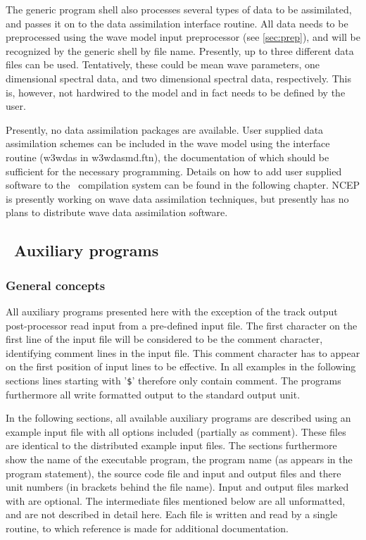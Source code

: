 The generic program shell also processes several types of data to be
assimilated, and passes it on to the data assimilation interface routine. All
data needs to be preprocessed using the wave model input preprocessor (see
\para\ref{sec:prep}), and will be recognized by the generic shell by file
name. Presently, up to three different data files can be used. Tentatively,
these could be mean wave parameters, one dimensional spectral data, and two
dimensional spectral data, respectively. This is, however, not hardwired to
the model and in fact needs to be defined by the user.

Presently, no data assimilation packages are available. User supplied data
assimilation schemes can be included in the wave model using the interface
routine ({\F w3wdas} in {\file w3wdasmd.ftn}), the documentation of which
should be sufficient for the necessary programming. Details on how to add user
supplied software to the \ws\ compilation system can be found in the following
chapter. NCEP is presently working on wave data assimilation techniques, but
presently has no plans to distribute wave data assimilation software.

\pb

\vssub
\subsection{~Auxiliary programs} \label{sec:auxprog}
\vsssub
\subsubsection{General concepts}
\vsssub

All auxiliary programs presented here with the exception of the track output
post-processor read input from a pre-defined input file. The first character
on the first line of the input file will be considered to be the comment
character, identifying comment lines in the input file. This comment character
has to appear on the first position of input lines to be effective. In all
examples in the following sections lines starting with '{\tt \$}' therefore
only contain comment. The programs furthermore all write formatted output to
the standard output unit.

In the following sections, all available auxiliary programs are described
using an example input file with all options included (partially as
comment). These files are identical to the distributed example input
files. The sections furthermore show the name of the executable program, the
program name (as appears in the program statement), the source code file and
input and output files and there unit numbers (in brackets behind the file
name). Input and output files marked with \opt are optional. The intermediate
files mentioned below are all {\F unformatted}, and are not described in
detail here. Each file is written and read by a single routine, to which
reference is made for additional documentation.

